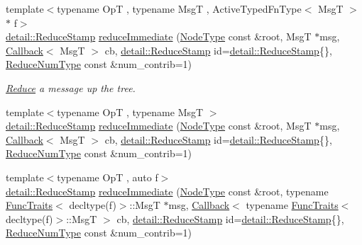 \begin{DoxyCompactItemize}
{\footnotesize template$<$typename OpT , typename MsgT , Active\+Typed\+Fn\+Type$<$ Msg\+T $>$ $\ast$ f$>$ }\\\hyperlink{namespacevt_1_1collective_1_1reduce_1_1detail_abcd205dec83706f347d55c7528bf2664}{detail\+::\+Reduce\+Stamp} \hyperlink{structvt_1_1collective_1_1reduce_1_1_reduce_a6c7cea8e7fe0d296db87e74189e93110}{reduce\+Immediate} (\hyperlink{namespacevt_a866da9d0efc19c0a1ce79e9e492f47e2}{Node\+Type} const \&root, MsgT $\ast$msg, \hyperlink{namespacevt_a57b238783d05de96bc2c4027f7073b7f}{Callback}$<$ MsgT $>$ cb, \hyperlink{namespacevt_1_1collective_1_1reduce_1_1detail_abcd205dec83706f347d55c7528bf2664}{detail\+::\+Reduce\+Stamp} id=\hyperlink{namespacevt_1_1collective_1_1reduce_1_1detail_abcd205dec83706f347d55c7528bf2664}{detail\+::\+Reduce\+Stamp}\{\}, \hyperlink{structvt_1_1collective_1_1reduce_1_1_reduce_a6c3e63aca10c31d2823b0b18cf9762a4}{Reduce\+Num\+Type} const \&num\+\_\+contrib=1)
\begin{DoxyCompactList}\small\item\em \hyperlink{structvt_1_1collective_1_1reduce_1_1_reduce}{Reduce} a message up the tree. \end{DoxyCompactList}\item 
{\footnotesize template$<$typename OpT , typename MsgT $>$ }\\\hyperlink{namespacevt_1_1collective_1_1reduce_1_1detail_abcd205dec83706f347d55c7528bf2664}{detail\+::\+Reduce\+Stamp} \hyperlink{structvt_1_1collective_1_1reduce_1_1_reduce_a296aa77831aa884e1feedbebdb9dd5d8}{reduce\+Immediate} (\hyperlink{namespacevt_a866da9d0efc19c0a1ce79e9e492f47e2}{Node\+Type} const \&root, MsgT $\ast$msg, \hyperlink{namespacevt_a57b238783d05de96bc2c4027f7073b7f}{Callback}$<$ MsgT $>$ cb, \hyperlink{namespacevt_1_1collective_1_1reduce_1_1detail_abcd205dec83706f347d55c7528bf2664}{detail\+::\+Reduce\+Stamp} id=\hyperlink{namespacevt_1_1collective_1_1reduce_1_1detail_abcd205dec83706f347d55c7528bf2664}{detail\+::\+Reduce\+Stamp}\{\}, \hyperlink{structvt_1_1collective_1_1reduce_1_1_reduce_a6c3e63aca10c31d2823b0b18cf9762a4}{Reduce\+Num\+Type} const \&num\+\_\+contrib=1)
\item 
{\footnotesize template$<$typename OpT , auto f$>$ }\\\hyperlink{namespacevt_1_1collective_1_1reduce_1_1detail_abcd205dec83706f347d55c7528bf2664}{detail\+::\+Reduce\+Stamp} \hyperlink{structvt_1_1collective_1_1reduce_1_1_reduce_aa67345409ff38a10715ee87821b02e10}{reduce\+Immediate} (\hyperlink{namespacevt_a866da9d0efc19c0a1ce79e9e492f47e2}{Node\+Type} const \&root, typename \hyperlink{structvt_1_1_func_traits}{Func\+Traits}$<$ decltype(f)$>$\+::MsgT $\ast$msg, \hyperlink{namespacevt_a57b238783d05de96bc2c4027f7073b7f}{Callback}$<$ typename \hyperlink{structvt_1_1_func_traits}{Func\+Traits}$<$ decltype(f)$>$\+::MsgT $>$ cb, \hyperlink{namespacevt_1_1collective_1_1reduce_1_1detail_abcd205dec83706f347d55c7528bf2664}{detail\+::\+Reduce\+Stamp} id=\hyperlink{namespacevt_1_1collective_1_1reduce_1_1detail_abcd205dec83706f347d55c7528bf2664}{detail\+::\+Reduce\+Stamp}\{\}, \hyperlink{structvt_1_1collective_1_1reduce_1_1_reduce_a6c3e63aca10c31d2823b0b18cf9762a4}{Reduce\+Num\+Type} const \&num\+\_\+contrib=1)

\end{DoxyCompactItemize}
